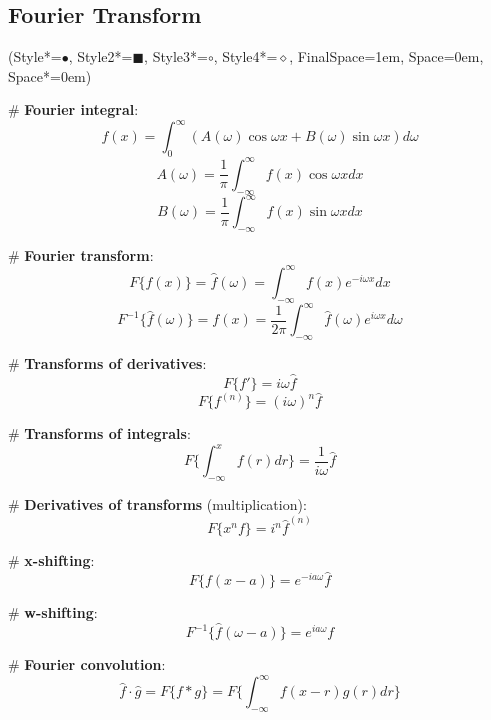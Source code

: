 \documentclass[11pt, oneside]{article}
\newcommand*{\begineasylist}{\begin{easylist}[itemize]\ListProperties(Style*=$\bullet$\quad, Style2*=\tiny$\blacksquare$\quad, Style3*=$\circ$\quad, Style4*=$\diamond$\quad, FinalSpace=1em, Space=0em, Space*=0em)}
\begin{document}
\subsection*{Fourier Transform}
\begineasylist

# \textbf{Fourier integral}:
\[ f(x) = \int_0^\infty (A(\omega)\cos\omega x + B(\omega)\sin\omega x )d\omega \]
\[ A(\omega)= \frac{1}{\pi}\int_{-\infty}^\infty f(x)\cos\omega xdx \]
\[ B(\omega)= \frac{1}{\pi}\int_{-\infty}^\infty f(x)\sin\omega xdx \]

# \textbf{Fourier transform}:
\[ F\{f(x)\} = \hat{f}(\omega) = \int_{-\infty}^\infty f(x)e^{-i\omega x}dx \]
\[ F^{-1}\{\hat{f}(\omega)\} = f(x) = \frac{1}{2\pi}\int_{-\infty}^\infty \hat{f}(\omega)e^{i\omega x}d\omega \]

# \textbf{Transforms of derivatives}:
\[ F\{f'\} = i\omega\hat{f} \]
\[ F\{f^{(n)}\} = (i\omega)^n \hat{f} \]

# \textbf{Transforms of integrals}:
\[ F\{ \int_{-\infty}^x f(r)dr \} = \frac{1}{i\omega}\hat f \]

# \textbf{Derivatives of transforms} (multiplication):
\[ F\{ x^nf \} = i^n\hat{f}^{(n)} \]

# \textbf{x-shifting}:
\[ F\{f(x-a)\} = e^{-ia\omega}\hat f \]

# \textbf{w-shifting}:
\[ F^{-1}\{\hat f(\omega - a)\} = e^{ia\omega}f \]

# \textbf{Fourier convolution}:
\[ \hat f \cdot \hat g = F\{f * g\} = F\{ \int_{-\infty}^\infty f(x-r)g(r)dr \} \]


\end{easylist}
\end{document}
